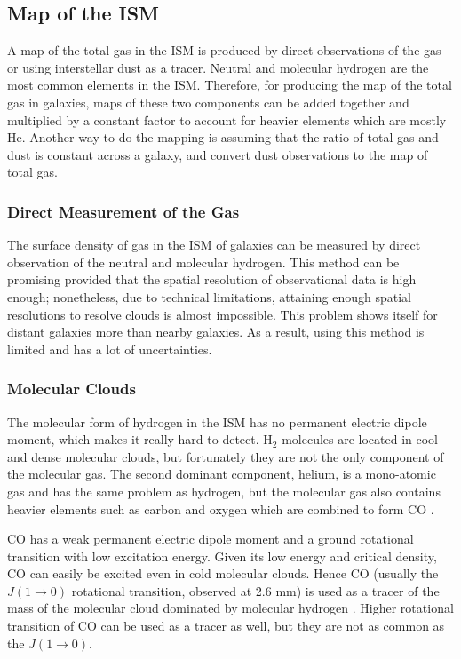 
\subsection{Map of the ISM}
\label{sec: ismmap}
A map of the total gas in the ISM is produced by direct observations of the gas or using interstellar dust as a tracer. 
Neutral and molecular hydrogen are the most common elements in the ISM. Therefore, for producing the map of the total gas in galaxies, maps of these two components can be added together and multiplied by a constant factor to account for heavier elements which are mostly He. Another way to do the mapping is assuming that the ratio of total gas and dust is constant across a galaxy, and convert dust observations to the map of total gas.

\subsubsection{Direct Measurement of the Gas}

The surface density of gas in the ISM of galaxies can be measured by direct observation of the neutral and molecular hydrogen. This method can be promising provided that the spatial resolution of observational data is high enough; nonetheless, due to technical limitations, attaining enough spatial resolutions to resolve clouds is almost impossible. This problem shows itself for distant galaxies more than nearby galaxies. As a result, using this method is limited and has a lot of uncertainties. 
 
\subsubsection*{Molecular Clouds}

 The molecular form of hydrogen in the ISM has no permanent electric dipole moment, which makes it really hard to detect. H$_2$ molecules are located in cool and dense molecular clouds, but fortunately they are not the only component of the molecular gas. The second dominant component, helium, is a mono-atomic gas and has the same problem as hydrogen, but the molecular gas also contains heavier elements such as carbon and oxygen which are combined to form CO \citep{Bolato13}. 
 
CO has a weak permanent electric dipole moment and a ground rotational transition with low excitation energy. Given its low energy and critical density, CO can easily be excited even in cold molecular clouds. Hence CO (usually the $J(1\rightarrow 0)$ rotational transition, observed at 2.6 mm) is used as a tracer of the mass of the molecular cloud dominated by molecular hydrogen \citep[see, for example,][] {Sanders84}. Higher rotational transition of CO can be used as a tracer as well, but they are not as common as the $J(1\rightarrow 0)$.

